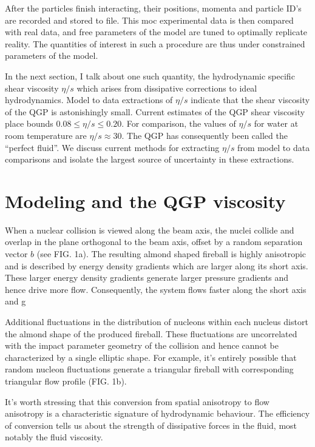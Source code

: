 \documentclass[aps,prc,reprint,amsmath,nofootinbib]{revtex4-1}
\begin{document}
After the particles finish interacting, their positions, momenta and particle ID's are recorded and stored to file. This moc experimental data is then compared with real
data, and free parameters of the model are tuned to optimally replicate reality. The quantities of interest in such a procedure are thus under constrained parameters of 
the model. 

In the next section, I talk about one such quantity, the hydrodynamic specific shear viscosity $\eta/s$ which arises from dissipative corrections to ideal hydrodynamics.
Model to data extractions of $\eta/s$ indicate that the shear viscosity of the QGP is astonishingly small. Current estimates of the QGP shear viscosity place bounds $0.08 \le \eta/s \le 0.20$. For comparison, the values of $\eta/s$ 
for water at room temperature are $\eta/s \approx 30$. The QGP has consequently been called the ``perfect fluid''. We discuss current methods for extracting $\eta/s$ from
model to data comparisons and isolate the largest source of uncertainty in these extractions.

\section{Modeling and the QGP viscosity}

When a nuclear collision is viewed along the beam axis, the nuclei collide and overlap in the plane orthogonal to the beam axis, offset by a random separation vector $b$ 
(see FIG. 1a). The resulting almond shaped fireball is highly anisotropic and is described by energy density gradients which are larger along its short axis. These larger 
energy density gradients generate larger pressure gradients and hence drive more flow. Consequently, the system flows faster along the short axis and g

Additional fluctuations in the distribution of nucleons within each nucleus distort the almond shape of the produced fireball. These fluctuations are uncorrelated with the 
impact parameter geometry of the collision and hence cannot be characterized by a single elliptic shape. For example, it's entirely possible that random nucleon fluctuations
generate a triangular fireball with corresponding triangular flow profile (FIG. 1b). 

It's worth stressing that this conversion from spatial anisotropy to flow anisotropy is a characteristic signature of hydrodynamic behaviour. The efficiency of conversion
tells us about the strength of dissipative forces in the fluid, most notably the fluid viscosity.
\end{document}
